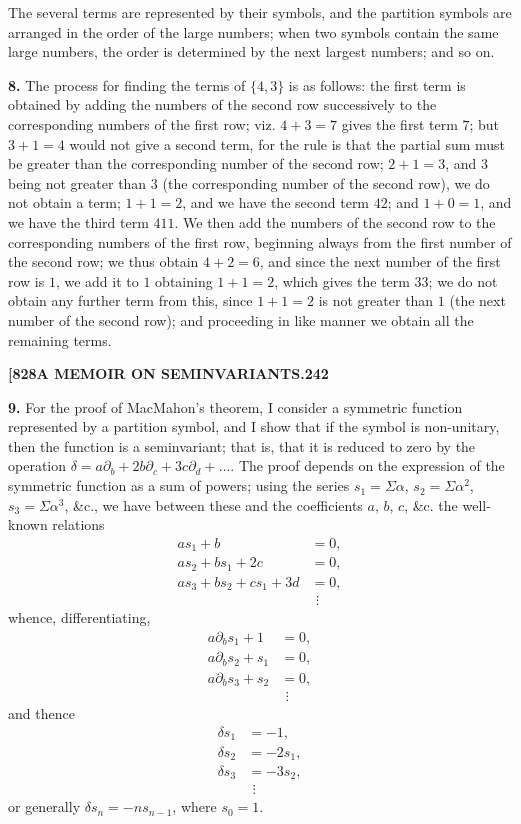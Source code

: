 \documentclass[12pt,a4paper]{article}
\theoremstyle{definition}
\begin{document}
The several terms are represented by their symbols, and the partition symbols are arranged in the order of the large numbers; when two symbols contain the same large numbers, the order is determined by the next largest numbers; and so on.

\noindent\textbf{8.} The process for finding the terms of $\{4, 3\}$ is as follows: the first term is obtained by adding the numbers of the second row successively to the corresponding numbers of the first row; viz. $4 + 3 = 7$ gives the first term $7$; but $3 + 1 = 4$ would not give a second term, for the rule is that the partial sum must be greater than the corresponding number of the second row; $2 + 1 = 3$, and $3$ being not greater than $3$ (the corresponding number of the second row), we do not obtain a term; $1 + 1 = 2$, and we have the second term $42$; and $1 + 0 = 1$, and we have the third term $411$. We then add the numbers of the second row to the corresponding numbers of the first row, beginning always from the first number of the second row; we thus obtain $4 + 2 = 6$, and since the next number of the first row is $1$, we add it to $1$ obtaining $1 + 1 = 2$, which gives the term $33$; we do not obtain any further term from this, since $1 + 1 = 2$ is not greater than $1$ (the next number of the second row); and proceeding in like manner we obtain all the remaining terms.

\newpage
\setcounter{page}{242}

\noindent\textbf{[828}\hfill\textbf{A MEMOIR ON SEMINVARIANTS.}\hfill\textbf{242}

\bigskip

\noindent\textbf{9.} For the proof of MacMahon's theorem, I consider a symmetric function represented by a partition symbol, and I show that if the symbol is non-unitary, then the function is a seminvariant; that is, that it is reduced to zero by the operation $\delta = a\partial_b + 2b\partial_c + 3c\partial_d + \dots$. The proof depends on the expression of the symmetric function as a sum of powers; using the series $s_1 = \Sigma\alpha$, $s_2 = \Sigma\alpha^2$, $s_3 = \Sigma\alpha^3$, \&c., we have between these and the coefficients $a$, $b$, $c$, \&c. the well-known relations
\begin{align*}
as_1 + b &= 0, \\
as_2 + bs_1 + 2c &= 0, \\
as_3 + bs_2 + cs_1 + 3d &= 0, \\
&\ \,\vdots
\end{align*}
whence, differentiating,
\begin{align*}
a\partial_b s_1 + 1 &= 0, \\
a\partial_b s_2 + s_1 &= 0, \\
a\partial_b s_3 + s_2 &= 0, \\
&\ \,\vdots
\end{align*}
and thence
\begin{align*}
\delta s_1 &= -1, \\
\delta s_2 &= -2s_1, \\
\delta s_3 &= -3s_2, \\
&\ \,\vdots
\end{align*}
or generally $\delta s_n = -ns_{n-1}$, where $s_0 = 1$.
\end{document}
